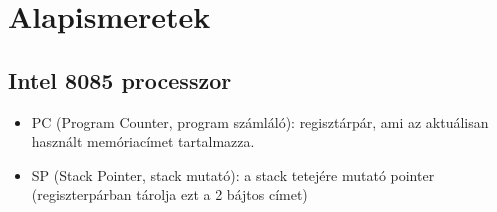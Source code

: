 \section{Alapismeretek}
\subsection{Intel 8085 processzor}
\begin{itemize}
  \item PC (Program Counter, program számláló): regisztárpár, ami az aktuálisan használt memóriacímet tartalmazza.
  \item SP (Stack Pointer, stack mutató): a stack tetejére mutató pointer (regiszterpárban tárolja ezt a 2 bájtos címet)
\end{itemize}
